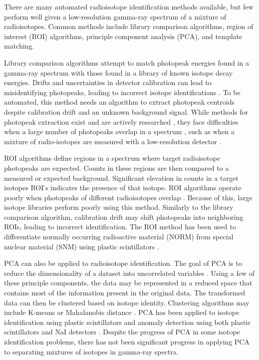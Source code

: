 There are many automated radioisotope identification methods available, but few perform well given a low-resolution gamma-ray spectrum of a mixture of radioisotopes. Common methods include library comparison algorithms, region of interest (ROI) algorithms, principle component analysis (PCA), and template matching.

Library comparison algorithms attempt to match photopeak energies found in a gamma-ray spectrum with those found in a library of known isotope decay energies. Drifts and uncertainties in detector calibration can lead to misidentifying photopeaks, leading to incorrect isotope identifications \cite{burr2009}. To be automated, this method needs an algorithm to extract photopeak centroids despite calibration drift and an unknown background signal. While methods for photopeak extraction exist and are actively researched \cite{mariscotti1967,DELOTTO1977,GARDNER2011}, they face difficulties when a large number of photopeaks overlap in a spectrum \cite{xiong2015}, such as when a mixture of radio-isotopes are measured with a low-resolution detector .

ROI algorithms define regions in a spectrum where target radioisotope photopeaks are expected. Counts in these regions are then compared to a measured or expected background. Significant elevation in counts in a target isotopes ROI's indicates the presence of that isotope. ROI algorithms operate poorly when photopeaks of different radioisotopes overlap \cite{burr2009}. Because of this, large isotope libraries perform poorly using this method. Similarly to the library comparison algorithm, calibration drift may shift photopeaks into neighboring ROIs, leading to incorrect identification. The ROI method has been used to differentiate normally occurring radioactive material (NORM) from special nuclear material (SNM) using plastic scintillators \cite{Ely2006}.

PCA can also be applied to radioisotope identification. The goal of PCA is to reduce the dimensionality of a dataset into uncorrelated variables \cite{Jolliffe2002}. Using a few of these principle components, the data may be represented in a reduced space that contains most of the information present in the original data. The transformed data can then be clustered based on isotope identity. Clustering algorithms may include K-means or Mahalanobis distance \cite{Kanungo2002, Kumari2012}. PCA has been applied to isotope identification using plastic scintillators \cite{Boardman2012} and anomaly detection using both plastic scintillators and NaI detectors \cite{runkle2006b}. Despite the progress of PCA in some isotope identification problems, there has not been significant progress in applying PCA to separating mixtures of isotopes in gamma-ray spectra.

